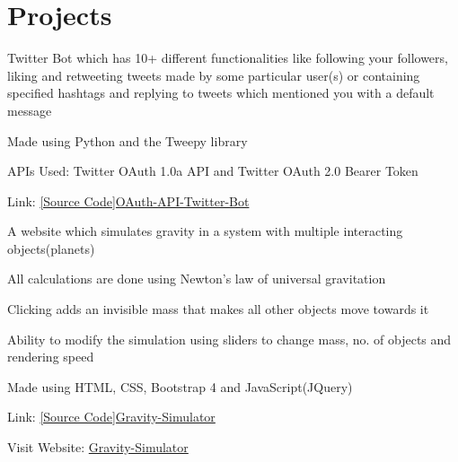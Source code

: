 \documentclass[]{deedy-resume-openfont}
\begin{document}
\begin{minipage}[t]{0.66\textwidth} 

%
%

\section{Projects}
\vspace{\topsep}
\begin{tightemize}
\item Twitter Bot which has 10+ different functionalities like following your followers, liking and retweeting tweets made by some particular user(s) or containing specified hashtags and replying to tweets which mentioned you with a default message
\item Made using Python and the Tweepy library
\item APIs Used: Twitter OAuth 1.0a API and Twitter OAuth 2.0 Bearer Token
\item Link: \href{https://github.com/utsavsingh899/OAuth-API-Twitter-Bot}{[Source Code]OAuth-API-Twitter-Bot}
\end{tightemize}
\sectionsep

\begin{tightemize}
\item A website which simulates gravity in a system with multiple interacting objects(planets)
\item All calculations are done using Newton's law of universal gravitation
\item Clicking adds an invisible mass that makes all other objects move towards it
\item Ability to modify the simulation using sliders to change mass, no. of objects and rendering speed
\item Made using HTML, CSS, Bootstrap 4 and JavaScript(JQuery)
\item Link: \href{https://github.com/utsavsingh899/Gravity-Simulator}{[Source Code]Gravity-Simulator}
\item Visit Website: \href{https://utsavsingh899.github.io/Gravity-Simulator/}{Gravity-Simulator}
\end{tightemize}
\sectionsep


\end{minipage}
\end{document}
